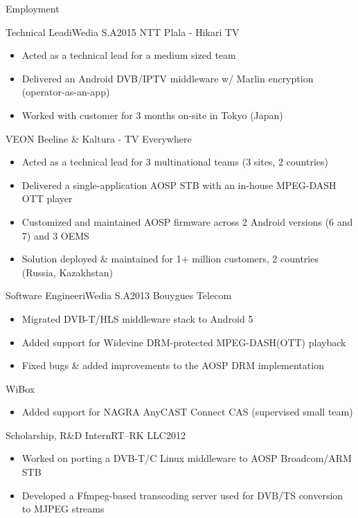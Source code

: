 \documentclass[]{mcdowellcv}
\begin{document}
\begin{cvsection}{Employment}
		\begin{cvsubsection}{Technical Lead}{iWedia S.A}{2015}
			NTT Plala - Hikari TV
			\begin{itemize}
				\item Acted as a technical lead for a medium sized team
				\item Delivered an Android DVB/IPTV middleware w/ Marlin encryption (operator-as-an-app)
				\item Worked with customer for 3 months on-site in Tokyo (Japan)
			\end{itemize}
			VEON Beeline \& Kaltura - TV Everywhere
			\begin{itemize}
				\item Acted as a technical lead for 3 multinational teams (3 sites, 2 countries)
				\item Delivered a single-application AOSP STB with an in-house MPEG-DASH OTT player
				\item Customized and maintained AOSP firmware across 2 Android versions (6 and 7) and 3 OEMS
				\item Solution deployed \& maintained for 1+ million customers, 2 countries (Russia, Kazakhstan)
			\end{itemize}
		\end{cvsubsection}

		\begin{cvsubsection}{Software Engineer}{iWedia S.A}{2013}
			Bouygues Telecom
			\begin{itemize}
				\item Migrated DVB-T/HLS middleware stack to Android 5
				\item Added support for Widevine DRM-protected MPEG-DASH(OTT) playback
				\item Fixed bugs \& added improvements to the AOSP DRM implementation
			\end{itemize}
			WiBox
			\begin{itemize}
				\item Added support for NAGRA AnyCAST Connect CAS (supervised small team)
			\end{itemize}
		\end{cvsubsection}

		\begin{cvsubsection}{Scholarship, R\&D Intern}{RT--RK LLC}{2012}
			\begin{itemize}
				\item Worked on porting a DVB-T/C Linux middleware to AOSP Broadcom/ARM STB
				\item Developed a Ffmpeg-based transcoding server used for DVB/TS conversion to MJPEG streams
			\end{itemize}
		\end{cvsubsection}

	\end{cvsection}
\end{document}
